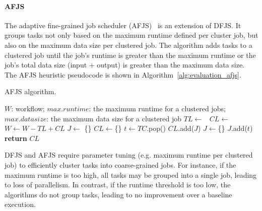 \paragraph{\textbf{AFJS}}
The adaptive fine-grained job scheduler (AFJS)~\cite{Liu2009} is an extension of DFJS. It groups tasks not only based on the maximum runtime defined per cluster job, but also on the maximum data size per clustered job. The algorithm adds tasks to a clustered job until the job's runtime is greater than the maximum runtime or the job's total data size (input + output) is greater than the maximum data size. The AFJS heuristic pseudocode is shown in Algorithm~\ref{alg:evaluation_afjs}. 

\begin{algorithm}[!htb]
	\caption{ AFJS algorithm.}
	\footnotesize
	\label{alg:evaluation_afjs}
	\begin{algorithmic}[1]
		\Require $W$: workflow; $max.runtime$: the maximum runtime for a clustered jobs; $max.datasize$: the maximum data size for a clustered job
				\State $TL\gets $\  
				\State $CL\gets$  \  
				\State $W \gets W - TL + CL$   
			\EndFor
		\EndProcedure
			\State $J\gets$ \{\}
			\State $CL\gets$\{\}
				\State $t \gets TC$.pop() 
				\State	$CL$.add($J$)
				\State	$J \gets$\{\}
				\EndIf	
				\State $J$.add($t$)
			\EndWhile
			\State \textbf{return} $CL$
		\EndProcedure
	\end{algorithmic}
\end{algorithm}

DFJS and AFJS require parameter tuning (e.g. maximum runtime per clustered job) to efficiently cluster tasks into coarse-grained jobs. For instance, if the maximum runtime is too high, all tasks may be grouped into a single job, leading to loss of parallelism. In contrast, if the runtime threshold is too low, the algorithms do not group tasks, leading to no improvement over a baseline execution. 

